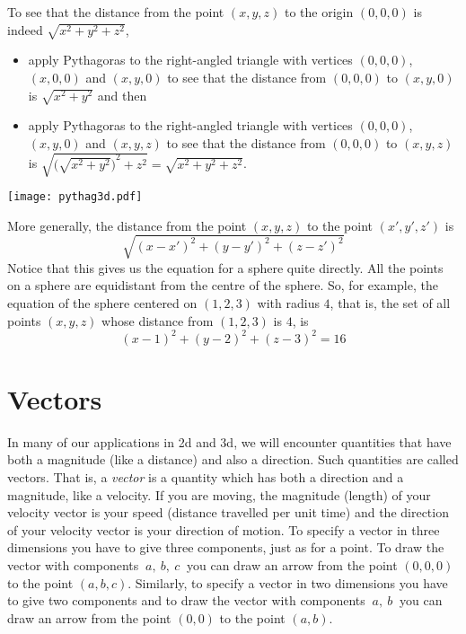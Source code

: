 To see that the distance from the point $(x,y,z)$ to the origin $(0,0,0)$ 
is indeed  $\sqrt{x^2+y^2+z^2}$,
\begin{itemize}\itemsep1pt \parskip0pt 
\item 
apply Pythagoras to the right-angled triangle with vertices $(0,0,0)$,
$(x,0,0)$ and $(x,y,0)$ to see that the distance from $(0,0,0)$
to $(x,y,0)$ is $\sqrt{x^2+y^2}$ and then
\item 
apply Pythagoras to the right-angled triangle with vertices $(0,0,0)$,
$(x,y,0)$ and $(x,y,z)$ to see that the distance from $(0,0,0)$
to $(x,y,z)$ is $\sqrt{{\big(\sqrt{x^2+y^2}\big)}^2+z^2}
=\sqrt{x^2+y^2+z^2}$.
\end{itemize}
\begin{efig}
\begin{center}
   \texttt{[image: pythag3d.pdf]}
\end{center}
\end{efig}
More generally, the distance from the point $(x,y,z)$ to the point 
$(x',y',z')$ is
\begin{equation*}
\sqrt{(x-x')^2+(y-y')^2+(z-z')^2}
\end{equation*}
Notice that this gives us the equation for a sphere quite directly. 
All the points on a sphere are equidistant from the centre of the sphere.
So, for example, the equation of the sphere centered on $(1,2,3)$ with 
radius $4$, that is, the set of all points $(x,y,z)$ whose distance 
from $(1,2,3)$ is $4$, is 
\begin{equation*}
(x-1)^2+(y-2)^2+(z-3)^2=16
\end{equation*}

\section{Vectors}\label{sec vectors}
In many of our applications in 2d and 3d, we will encounter quantities
that have both a magnitude (like a distance) and also a 
direction. Such quantities are called vectors. That is,
a \emph{vector} is a quantity which has both a direction and a magnitude,
like a velocity. If you are moving, the magnitude (length) of your 
velocity vector is your speed (distance travelled per unit time)  and the
direction of your velocity vector is your direction of motion. To specify 
a vector in three dimensions you have to give three components, just as for 
a point. To draw the vector with components $\ a,\ b,\ c\ $ you can draw 
an arrow from the point $(0,0,0)$ to the point $(a,b,c)$. 
%
Similarly, to specify a vector in two dimensions
you have to give two components and to draw the vector
with components $\ a,\ b\ $ you can draw an arrow from the point $(0,0)$
to the point $(a,b)$.


